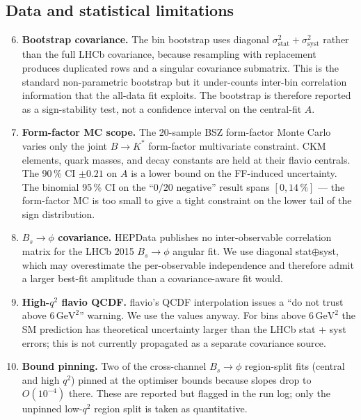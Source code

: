 \subsection{Data and statistical limitations}

\begin{enumerate}\setcounter{enumi}{5}
\item \textbf{Bootstrap covariance.} The bin bootstrap uses diagonal
  $\sigma_{\mathrm{stat}}^{2}+\sigma_{\mathrm{syst}}^{2}$ rather than
  the full LHCb covariance, because resampling with replacement
  produces duplicated rows and a singular covariance submatrix. This
  is the standard non-parametric bootstrap but it under-counts
  inter-bin correlation information that the all-data fit exploits.
  The bootstrap is therefore reported as a sign-stability test, not
  a confidence interval on the central-fit $A$.

\item \textbf{Form-factor MC scope.} The 20-sample BSZ form-factor
  Monte Carlo varies only the joint $B\to K^{*}$ form-factor
  multivariate constraint. CKM elements, quark masses, and decay
  constants are held at their flavio centrals. The 90\,\% CI
  $\pm 0.21$ on $A$ is a lower bound on the FF-induced uncertainty.
  The binomial 95\,\% CI on the ``$0/20$ negative'' result spans
  $[0, 14\,\%]$ — the form-factor MC is too small to give a tight
  constraint on the lower tail of the sign distribution.

\item \textbf{$B_{s}\to\phi$ covariance.} HEPData publishes no
  inter-observable correlation matrix for the LHCb 2015
  $B_{s}\to\phi$ angular fit. We use diagonal stat$\oplus$syst, which
  may overestimate the per-observable independence and therefore
  admit a larger best-fit amplitude than a covariance-aware fit
  would.

\item \textbf{High-$q^{2}$ flavio QCDF.} flavio's QCDF interpolation
  issues a ``do not trust above $6\,\mathrm{GeV}^{2}$'' warning. We
  use the values anyway. For bins above $6\,\mathrm{GeV}^{2}$ the SM
  prediction has theoretical uncertainty larger than the LHCb stat
  + syst errors; this is not currently propagated as a separate
  covariance source.

\item \textbf{Bound pinning.} Two of the cross-channel
  $B_{s}\!\to\!\phi$ region-split fits (central and high $q^{2}$)
  pinned at the optimiser bounds because slopes drop to
  $O(10^{-4})$ there. These are reported but flagged in the run log;
  only the unpinned low-$q^{2}$ region split is taken as quantitative.


\end{enumerate}
